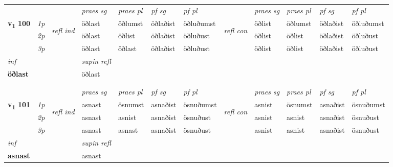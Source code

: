 \begin{longtable}[l]{X>{\footnotesize\itshape}llXXXXlXXXX}
 & &   & \textit{praes sg}  & \textit{praes pl}    & \textit{ pf sg} & \textit{pf pl} & & \textit{praes sg}  & \textit{praes pl}    & \textit{pf sg} & \textit{pf pl }  \\ \cmidrule{4-7} \cmidrule{9-12}
 \multirow{2}{*}{{{\textbf{v{\textsubscript{1}}} \Large{\textbf{100}}}}}  & 1p & \multirow{3}{*}{\begin{turn}{90}\textit{refl ind}\end{turn}}  & öðlast & öðlumst & öðlaðist & öðluðumst & \multirow{3}{*}{\begin{turn}{90}\textit{refl con}\end{turn}}  &öðlist & öðlumst & öðlaðist & öðluðumst \\*
 & 2p &  & öðlast & öðlist & öðlaðist & öðluðust & &öðlist & öðlist & öðlaðist & öðluðust \\*
 & 3p  & & öðlast & öðlast & öðlaðist & öðluðust & & öðlist & öðlist& öðlaðist & öðluðust \\*
\cmidrule{4-7} \cmidrule{9-12}

   {\textit{inf}} & &       & \textit{supin refl}  \\*
  {\textbf{öðlast}} & &       & öðlast  \\*

\midrule
& \\*
& \\
   \midrule
 & &   & \textit{praes sg}  & \textit{praes pl}    & \textit{ pf sg} & \textit{pf pl} & & \textit{praes sg}  & \textit{praes pl}    & \textit{pf sg} & \textit{pf pl }  \\ \cmidrule{4-7} \cmidrule{9-12}
 \multirow{2}{*}{{{\textbf{v{\textsubscript{1}}} \Large{\textbf{101}}}}}  & 1p & \multirow{3}{*}{\begin{turn}{90}\textit{refl ind}\end{turn}}  & asnast & ösnumst & asnaðist & ösnuðumst & \multirow{3}{*}{\begin{turn}{90}\textit{refl con}\end{turn}}  &asnist & ösnumst & asnaðist & ösnuðumst \\*
 & 2p &  & asnast & asnist & asnaðist & ösnuðust & &asnist & asnist & asnaðist & ösnuðust \\*
 & 3p  & & asnast & asnast & asnaðist & ösnuðust & & asnist & asnist& asnaðist & ösnuðust \\*
\cmidrule{4-7} \cmidrule{9-12}

   {\textit{inf}} & &       & \textit{supin refl}  \\*
  {\textbf{asnast}} & &       & asnast  \\*


\end{longtable}
